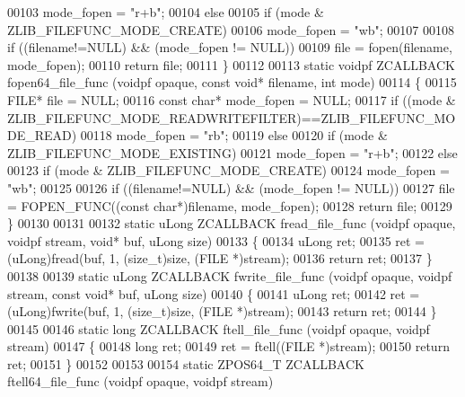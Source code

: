 \begin{DoxyCode}
00103         mode\_fopen = \textcolor{stringliteral}{"r+b"};
00104     \textcolor{keywordflow}{else}
00105     \textcolor{keywordflow}{if} (mode & ZLIB\_FILEFUNC\_MODE\_CREATE)
00106         mode\_fopen = \textcolor{stringliteral}{"wb"};
00107 
00108     \textcolor{keywordflow}{if} ((filename!=NULL) && (mode\_fopen != NULL))
00109         file = fopen(filename, mode\_fopen);
00110     \textcolor{keywordflow}{return} file;
00111 \}
00112 
00113 \textcolor{keyword}{static} voidpf ZCALLBACK fopen64\_file\_func (voidpf opaque, \textcolor{keyword}{const} \textcolor{keywordtype}{void}* filename, \textcolor{keywordtype}{int} mode)
00114 \{
00115     FILE* file = NULL;
00116     \textcolor{keyword}{const} \textcolor{keywordtype}{char}* mode\_fopen = NULL;
00117     \textcolor{keywordflow}{if} ((mode & ZLIB\_FILEFUNC\_MODE\_READWRITEFILTER)==ZLIB\_FILEFUNC\_MODE\_READ)
00118         mode\_fopen = \textcolor{stringliteral}{"rb"};
00119     \textcolor{keywordflow}{else}
00120     \textcolor{keywordflow}{if} (mode & ZLIB\_FILEFUNC\_MODE\_EXISTING)
00121         mode\_fopen = \textcolor{stringliteral}{"r+b"};
00122     \textcolor{keywordflow}{else}
00123     \textcolor{keywordflow}{if} (mode & ZLIB\_FILEFUNC\_MODE\_CREATE)
00124         mode\_fopen = \textcolor{stringliteral}{"wb"};
00125 
00126     \textcolor{keywordflow}{if} ((filename!=NULL) && (mode\_fopen != NULL))
00127         file = FOPEN\_FUNC((\textcolor{keyword}{const} \textcolor{keywordtype}{char}*)filename, mode\_fopen);
00128     \textcolor{keywordflow}{return} file;
00129 \}
00130 
00131 
00132 \textcolor{keyword}{static} uLong ZCALLBACK fread\_file\_func (voidpf opaque, voidpf stream, \textcolor{keywordtype}{void}* buf, uLong size)
00133 \{
00134     uLong ret;
00135     ret = (uLong)fread(buf, 1, (\textcolor{keywordtype}{size\_t})size, (FILE *)stream);
00136     \textcolor{keywordflow}{return} ret;
00137 \}
00138 
00139 \textcolor{keyword}{static} uLong ZCALLBACK fwrite\_file\_func (voidpf opaque, voidpf stream, \textcolor{keyword}{const} \textcolor{keywordtype}{void}* buf, uLong size)
00140 \{
00141     uLong ret;
00142     ret = (uLong)fwrite(buf, 1, (\textcolor{keywordtype}{size\_t})size, (FILE *)stream);
00143     \textcolor{keywordflow}{return} ret;
00144 \}
00145 
00146 \textcolor{keyword}{static} \textcolor{keywordtype}{long} ZCALLBACK ftell\_file\_func (voidpf opaque, voidpf stream)
00147 \{
00148     \textcolor{keywordtype}{long} ret;
00149     ret = ftell((FILE *)stream);
00150     \textcolor{keywordflow}{return} ret;
00151 \}
00152 
00153 
00154 \textcolor{keyword}{static} ZPOS64\_T ZCALLBACK ftell64\_file\_func (voidpf opaque, voidpf stream)

\end{DoxyCode}
